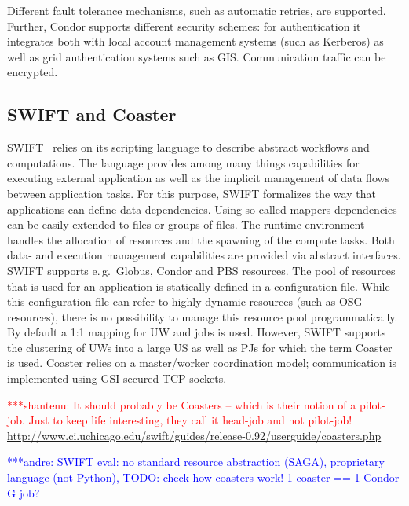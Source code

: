 \documentclass[conference,final]{IEEEtran}
\newcommand{\jhanote}[1]{ {\textcolor{red} { ***shantenu: #1 }}}
\newcommand{\alnote}[1]{ {\textcolor{blue} { ***andre: #1 }}}
\newcommand{\alnote}[1]{}
\newcommand{\jhanote}[1]{}
\newcommand{\upp}{\vspace*{-0.5em}}
\begin{document}
Different fault tolerance mechanisms, such as automatic retries, are supported.
Further, Condor supports different security schemes: for authentication it
integrates both with local account management systems (such as Kerberos) as well
as grid authentication systems such as GIS. Communication traffic can be
encrypted.



\subsection{SWIFT and Coaster\upp\upp}

SWIFT~\cite{Wilde2011} relies on its scripting language to describe abstract
workflows and computations. The language provides among many things capabilities
for executing external application as well as the implicit management of data
flows between application tasks. For this purpose, SWIFT formalizes the way that
applications can define data-dependencies. Using so called mappers dependencies
can be easily extended to files or groups of files. The runtime environment
handles the allocation of resources and the spawning of the compute tasks. Both
data- and execution management capabilities are provided via abstract
interfaces. SWIFT supports e.\,g.\ Globus, Condor and PBS resources. The pool of
resources that is used for an application is statically defined in a
configuration file. While this configuration file can refer to highly dynamic
resources (such as OSG resources), there is no possibility to manage this
resource pool programmatically. By default a 1:1 mapping for UW and jobs is
used. However, SWIFT supports the clustering of UWs into a large US as
well as PJs for which the term Coaster~\cite{coasters} is used. Coaster
relies on a master/worker coordination model; communication is implemented using
GSI-secured TCP sockets.



\jhanote{It should probably be Coasters -- which is their notion of a pilot-job.
Just to keep life interesting, they call it head-job and not pilot-job!
\url{http://www.ci.uchicago.edu/swift/guides/release-0.92/userguide/coasters.php
}}


\alnote{SWIFT eval: no standard resource abstraction (SAGA), proprietary 
language (not Python), TODO: check how coasters work! 1 coaster == 1 Condor-G 
job?}


\end{document}
